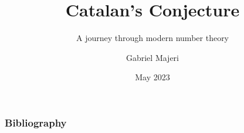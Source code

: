 \documentclass{beamer}
\title{Catalan's Conjecture}
\subtitle{A journey through modern number theory}
\author{Gabriel Majeri}
\date{May 2023}
\theoremstyle{definition}
\begin{document}
\frame{\titlepage}









\begin{frame}[t,allowframebreaks]
    \nocite{*}
    \frametitle{Bibliography}
    \printbibliography
\end{frame}
\end{document}
